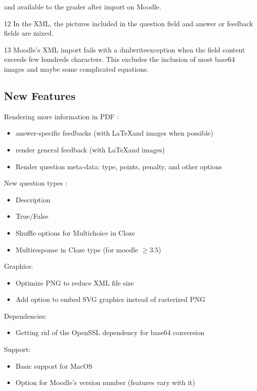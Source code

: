 \documentclass[twocolumn,a4paper,9pt]{article}
\begin{document}
\begin{table*}[tbp]
\begin{threeparttable}[b]
\begin{tablenotes}
			and 
			available to the grader after import on Moodle.
			\item[12] In the XML, the pictures included in the question field 
			and answer or 
			feedback fields are mixed.
			\item[13] Moodle's XML import fails with a 
			\textsf{dmlwriteexception} when the 
			field content exceeds few hundreds characters. This excludes the 
			inclusion of 
			most base64 images and maybe some complicated equations.
		\end{tablenotes}
	\end{threeparttable}
\end{table*}

\subsection{New Features}

Rendering more information in PDF :
\begin{itemize}
	\item answer-specific feedbacks (with \LaTeX and images when possible)
	\item render general feedback (with \LaTeX and images)
	\item Render question meta-data: type, points, penalty, and other options
\end{itemize}

New question types :
\begin{itemize}
	\item Description
	\item True/False
	\item Shuffle options for Multichoice in Cloze
	\item Multiresponse in Cloze type (for moodle $\geq 3.5$)
\end{itemize}

Graphics:
\begin{itemize}
	\item Optimize PNG to reduce XML file size
	\item Add option to embed SVG graphics instead of rasterized PNG
\end{itemize}

Dependencies:
\begin{itemize}
	\item Getting rid of the OpenSSL dependency for base64 conversion
\end{itemize}

Support:
\begin{itemize}
	\item Basic support for MacOS
	\item Option for Moodle's version number (features vary with it)
\end{itemize}
\end{document}
